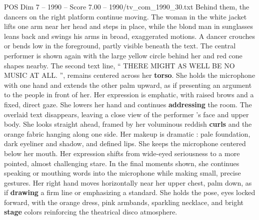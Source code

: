 \begin{textsample}{POS Dim 7 – 1990 – Score 7.00 – 1990/tv\_com\_1990\_30.txt}
Behind them, the dancers on the right platform continue moving.
The woman in the white jacket lifts one arm near her head and steps in place, while the blond man in sunglasses leans back and swings his arms in broad, exaggerated motions.
A dancer crouches or bends low in the foreground, partly visible beneath the text.
The central performer is shown again with the large yellow circle behind her and red cone shapes nearby.
The second text line, “ THERE MIGHT AS WELL BE NO MUSIC AT ALL. ”, remains centered across her \textbf{torso}.
She holds the microphone with one hand and extends the other palm upward, as if presenting an argument to the people in front of her.
Her expression is emphatic, with raised brows and a fixed, direct gaze.
She lowers her hand and continues \textbf{addressing} the room.
The overlaid text disappears, leaving a close view of the performer ’s face and upper body.
She looks straight ahead, framed by her voluminous reddish \textbf{curls} and the orange fabric hanging along one side.
Her makeup is dramatic : pale foundation, dark eyeliner and shadow, and defined lips.
She keeps the microphone centered below her mouth.
Her expression shifts from wide-eyed seriousness to a more pointed, almost challenging stare.
In the final moments shown, she continues speaking or mouthing words into the microphone while making small, precise gestures.
Her right hand moves horizontally near her upper chest, palm down, as if \textbf{drawing} a firm line or emphasizing a standard.
She holds the pose, eyes locked forward, with the orange dress, pink armbands, sparkling necklace, and bright \textbf{stage} colors reinforcing the theatrical disco atmosphere.

\end{textsample}
